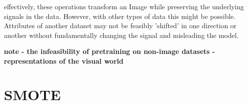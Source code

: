 effectively, these operations transform an Image while preserving the underlying signals in the data. However, with other types of data this might be possible. Attributes of another dataset may not be feasibly 'shifted' in one direction or another without fundamentally changing the signal and misleading the model.

\textbf{note - the infeasibility of pretraining on non-image datasets - representations of the visual world}

\section{SMOTE}

